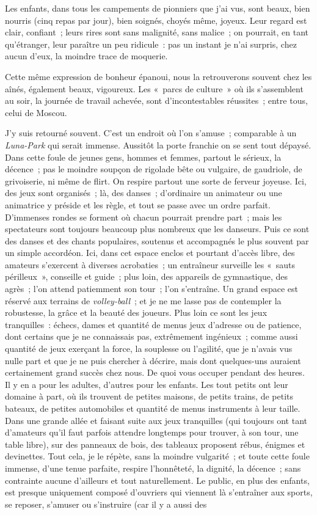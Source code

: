 \documentclass[french,twoside]{book} %
\newcommand{\astermono}{\medskip\centerline{\color{rubric}\large\selectfont{\syms ✻}}\medskip\par}%
\begin{document}
\astermono

\noindent Les enfants, dans tous les campements de pionniers que j’ai vus, sont beaux, bien nourris (cinq repas par jour), bien soignés, choyés même, joyeux. Leur regard est clair, confiant ; leurs rires sont sans malignité, sans malice ; on pourrait, en tant qu’étranger, leur paraître un peu ridicule : pas un instant je n’ai surpris, chez aucun d’eux, la moindre trace de moquerie.\par
Cette même expression de bonheur épanoui, nous la retrouverons souvent chez les aînés, également beaux, vigoureux. Les « parcs de culture » où ils s’assemblent au soir, la journée de travail achevée, sont d’incontestables réussites ; entre tous, celui de Moscou.\par
J’y suis retourné souvent. C’est un endroit où l’on s’amuse ; comparable à un \emph{Luna-Park} qui serait immense. Aussitôt la porte franchie on se sent tout dépaysé. Dans cette foule de jeunes gens, hommes et femmes, partout le sérieux, la décence ; pas le moindre soupçon de rigolade bête ou vulgaire, de gaudriole, de grivoiserie, ni même de flirt. On respire partout une sorte de ferveur joyeuse. Ici, des jeux sont organisés ; là, des danses ; d’ordinaire un animateur ou une animatrice y préside et les règle, et tout se passe avec un ordre parfait. D’immenses rondes se forment où chacun pourrait prendre part ; mais les spectateurs sont toujours beaucoup plus nombreux que les danseurs. Puis ce sont des danses et des chants populaires, soutenus et accompagnés le plus souvent par un simple accordéon. Ici, dans cet espace enclos et pourtant d’accès libre, des amateurs s’exercent à diverses acrobaties ; un entraîneur surveille les « sauts périlleux », conseille et guide ; plus loin, des appareils de gymnastique, des agrès ; l’on attend patiemment son tour ; l’on s’entraîne. Un grand espace est réservé aux terrains de \emph{volley-ball} ; et je ne me lasse pas de contempler la robustesse, la grâce et la beauté des joueurs. Plus loin ce sont les jeux tranquilles : échecs, dames et quantité de menus jeux d’adresse ou de patience, dont certains que je ne connaissais pas, extrêmement ingénieux ; comme aussi quantité de jeux exerçant la force, la souplesse ou l’agilité, que je n’avais vus nulle part et que je ne puis chercher à décrire, mais dont quelques-uns auraient certainement grand succès chez nous. De quoi vous occuper pendant des heures. Il y en a pour les adultes, d’autres pour les enfants. Les tout petits ont leur domaine à part, où ils trouvent de petites maisons, de petits trains, de petits bateaux, de petites automobiles et quantité de menus instruments à leur taille. Dans une grande allée et faisant suite aux jeux tranquilles (qui toujours ont tant d’amateurs qu’il faut parfois attendre longtemps pour trouver, à son tour, une table libre), sur des panneaux de bois, des tableaux proposent rébus, énigmes et devinettes. Tout cela, je le répète, sans la moindre vulgarité ; et toute cette foule immense, d’une tenue parfaite, respire l’honnêteté, la dignité, la décence ; sans contrainte aucune d’ailleurs et tout naturellement. Le public, en plus des enfants, est presque uniquement composé d’ouvriers qui viennent là s’entraîner aux sports, se reposer, s’amuser ou s’instruire (car il y a aussi des 
\end{document}
